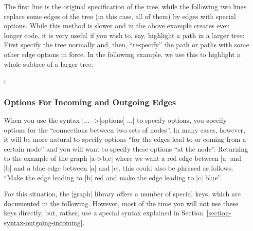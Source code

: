 The first line is the original specification of the tree, while the following
two lines replace some edges of the tree (in this case, all of them) by edges
with special options. While this method is slower and in the above example
creates even longer code, it is very useful if you wish to, say, highlight a
path in a larger tree: First specify the tree normally and, then, ``respecify''
the path or paths with some other edge options in force. In the following
example, we use this to highlight a whole subtree of a larger tree:
\begin{codeexample}[]
\tikz {};
\end{codeexample}


\subsubsection{Options For Incoming and Outgoing Edges}

When you use the syntax |... ->[options] ...| to specify options, you specify
options for the ``connections between two sets of nodes''. In many cases,
however, it will be more natural to specify options ``for the edges lead to or
coming from a certain node'' and you will want to specify these options ``at
the node''. Returning to the example of the graph |a->{b,c}| where we want a
red edge between |a| and |b| and a blue edge between |a| and |c|, this could
also be phrased as follows: ``Make the edge leading to |b| red and make the
edge leading to |c| blue''.

For this situation, the |graph| library offers a number of special keys, which
are documented in the following. However, most of the time you will not use
these keys directly, but, rather, use a special syntax explained in
Section~\ref{section-syntax-outgoing-incoming}.

